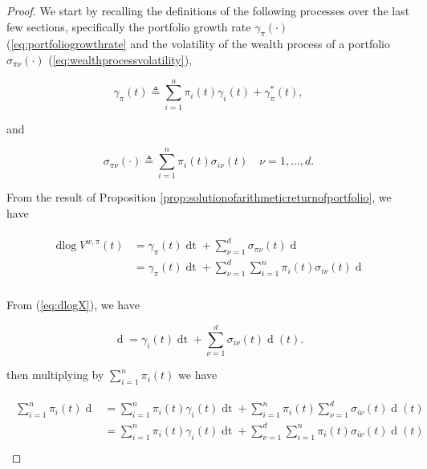 \documentclass[british]{amsart} \usepackage{lmodern}
\numberwithin{equation}{section} \numberwithin{figure}{section}
\theoremstyle{plain} \newtheorem{thm}{\protect\theoremname}[section]
\theoremstyle{definition} \newtheorem{defn}[thm]{\protect\definitionname}
\theoremstyle{plain} \newtheorem{assumption}[thm]{\protect\assumptionname}
\theoremstyle{plain} \newtheorem{lem}[thm]{\protect\lemmaname}
\theoremstyle{plain} \newtheorem{prop}[thm]{\protect\propositionname}
\theoremstyle{remark} \newtheorem{rem}[thm]{\protect\remarkname}
\theoremstyle{plain} \newtheorem{cor}[thm]{\protect\corollaryname}
\renewcommand{\d}[1]{\mathop{\mathrm{d}{#1}}}
\newcommand{\defeq}{\mathop{\triangleq}} \newcommand{\almostsurely}{\text{a.s.}}
\newcommand{\V}{V^{w,\pi}}
\begin{document}
\begin{proof}
  We start by recalling the definitions of the following processes over the last
  few sections, specifically the portfolio growth rate $\gamma_{\pi}(\cdot)$
  (\ref{eq:portfoliogrowthrate} and the volatility of the wealth process of a
  portfolio $\sigma_{\pi\nu}(\cdot)$ (\ref{eq:wealthprocessvolatility}), 
  
  \begin{equation}
    \gamma_{\pi}(t) \defeq 
      \sum_{i=1}^{n} \pi_{i}(t)\gamma_{i}(t) + \gamma_{\pi}^{*}(t),
  \end{equation}

  and

  \begin{equation}
    \sigma_{\pi\nu}(\cdot) \defeq \sum_{i=1}^{n} \pi_{i}(t) \sigma_{i\nu}(t)
    \quad \nu=1,\dots,d.
  \end{equation}

  From the result of Proposition
\ref{prop:solutionofarithmeticreturnofportfolio}, we have 

  \begin{gather}
    \begin{split}
      \label{eq:dlogVstep1}
      \d\log{\V(t)} 
      &=  
        \gamma_{\pi}(t) \d{t} +
        \sum_{\nu=1}^{d} \sigma_{\pi\nu}(t) \d{W_{\nu}(t)} \\
      &=
        \gamma_{\pi}(t) \d{t} +
        \sum_{\nu=1}^{d} \sum_{i=1}^{n} \pi_{i}(t) \sigma_{i\nu}(t) \d{W_{\nu}(t)} \\
    \end{split}
  \end{gather}

  From (\ref{eq:dlogX}), we have

  \begin{equation}
        \d{\log{X_{i}(t)}} =
          \gamma_{i}(t) \d{t} +
          \sum_{\nu=1}^{d} \sigma_{i\nu}(t) \d{W_{\nu}}(t).
  \end{equation}

  then multiplying by $\sum_{i=1}^{n} \pi_{i}(t)$ we have 
 
  \begin{gather*}
    \begin{split}
       \sum_{i=1}^{n} \pi_{i}(t) \d{\log{X_{i}(t)}} 
        &=
          \sum_{i=1}^{n} \pi_{i}(t) \gamma_{i}(t) \d{t} +
          \sum_{i=1}^{n} \pi_{i}(t) \sum_{\nu=1}^{d} \sigma_{i\nu}(t) \d{W_{\nu}}(t) \\
        &=
          \sum_{i=1}^{n} \pi_{i}(t) \gamma_{i}(t) \d{t} +
          \sum_{\nu=1}^{d} \sum_{i=1}^{n} \pi_{i}(t) \sigma_{i\nu}(t) \d{W_{\nu}}(t) \\
    \end{split}
  \end{gather*}


\end{proof}
\end{document}
